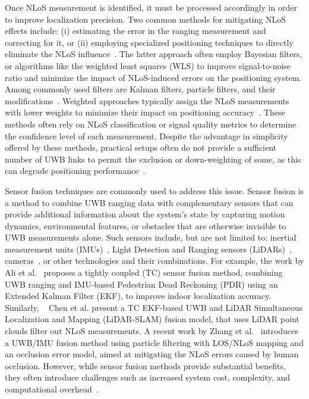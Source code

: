 Once NLoS measurement is identified, it must be processed accordingly in order to improve localization precision. Two common methods for mitigating NLoS effects include: (i) estimating the error in the ranging measurement and correcting for it, or (ii) employing specialized positioning techniques to directly eliminate the NLoS influence~\cite{yu2018novel}. The latter approach often employ Bayesian filters, or algorithms like the weighted least squares (WLS) to improve signal-to-noise ratio and minimize the impact of NLoS-induced errors on the positioning system. Among commonly used filters are Kalman filters, particle filters, and their modifications~\cite{Wang2023NLoS}. Weighted approaches typically assign the NLoS measurements with lower weights to minimize their impact on positioning accuracy~\cite{Wang2023NLoS}. These methods often rely on NLoS classification or signal quality metrics to determine the confidence level of each measurement. Despite the advantage in simplicity offered by these methods, practical setups often do not provide a sufficient number of UWB links to permit the exclusion or down-weighting of some, as this can degrade positioning performance~\cite{ferreira2021feature}.

Sensor fusion techniques are commonly used to address this issue. Sensor fusion is a method to combine UWB ranging data with complementary sensors that can provide additional information about the system's state by capturing motion dynamics, environmental features, or obstacles that are otherwise invisible to UWB measurements alone.  Such sensors include, but are not limited to:  inertial measurement units (IMUs)~\cite{Kim2021IMU}, Light Detection and Ranging sensors (LiDARs)~\cite{Chen2022LIDAR}, cameras~\cite{Peng2022Visual}, or other technologies and their combinations. For example, the work by Ali et al.~\cite{Ali2021IMU} proposes a tightly coupled (TC) sensor fusion method, combining UWB ranging and IMU-based Pedestrian Dead Reckoning (PDR) using an Extended Kalman Filter (EKF), to improve indoor localization accuracy. Similarly, ~\cite{Chen2022LIDAR} Chen et al. present a TC EKF-based UWB and LiDAR Simultaneous Localization and Mapping (LiDAR-SLAM) fusion model, that uses LiDAR point clouds filter out NLoS measurements. A recent work by Zhang et al.~\cite{zhang2023research} introduces a UWB/IMU fusion method using particle filtering with LOS/NLoS mapping and an occlusion error model, aimed at mitigating the NLoS errors caused by human occlusion. However, while sensor fusion methods provide substantial benefits, they often introduce challenges such as increased system cost, complexity, and computational overhead~\cite{Naheem2022IMU, wang2024comprehensive}.

